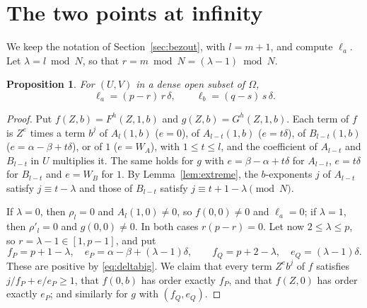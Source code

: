 \documentclass[11pt]{amsart}
\newtheorem{proposition}[theorem]{Proposition}
\theoremstyle{definition}
\theoremstyle{remark}
\numberwithin{equation}{section}
\begin{document}
\section{The two points at infinity}\label{sec:local}

We keep the notation of Section~\ref{sec:bezout}, with $l=m+1$, and compute $\ell_a$. Let $\lambda=l\bmod N$, so that $r=m\bmod N=(\lambda-1)\bmod N$.

\begin{proposition}\label{prop:local}
For $(U,V)$ in a dense open subset of $\Omega$,
\[
\ell_a=(p-r)\,r\,\delta,\qquad \ell_b=(q-s)\,s\,\delta .
\]
\end{proposition}

\begin{proof}
Put $f(Z,b)=F^h(Z,1,b)$ and $g(Z,b)=G^h(Z,1,b)$. Each term of $f$ is $Z^e$ times a term $b^j$ of $A_l(1,b)$ ($e=0$), of $A_{l-t}(1,b)$ ($e=t\delta$), of $B_{l-t}(1,b)$ ($e=\alpha-\beta+t\delta$), or of $1$ ($e=W_A$), with $1\le t\le l$, and the coefficient of $A_{l-t}$ and $B_{l-t}$ in $U$ multiplies it. The same holds for $g$ with $e=\beta-\alpha+t\delta$ for $A_{l-t}$, $e=t\delta$ for $B_{l-t}$ and $e=W_B$ for $1$. By Lemma~\ref{lem:extreme}, the $b$-exponents $j$ of $A_{l-t}$ satisfy $j\equiv t-\lambda$ and those of $B_{l-t}$ satisfy $j\equiv t+1-\lambda\pmod N$.

If $\lambda=0$, then $\rho_l=0$ and $A_l(1,0)\ne0$, so $f(0,0)\ne0$ and $\ell_a=0$; if $\lambda=1$, then $\rho'_l=0$ and $g(0,0)\ne0$. In both cases $r(p-r)=0$. Let now $2\le\lambda\le p$, so $r=\lambda-1\in[1,p-1]$, and put
\[
f_P=p+1-\lambda,\quad e_P=\alpha-\beta+(\lambda-1)\delta,\qquad f_Q=p+2-\lambda,\quad e_Q=(\lambda-1)\delta .
\]
These are positive by \eqref{eq:deltabig}. We claim that every term $Z^eb^j$ of $f$ satisfies $j/f_P+e/e_P\ge1$, that $f(0,b)$ has order exactly $f_P$, and that $f(Z,0)$ has order exactly $e_P$; and similarly for $g$ with $(f_Q,e_Q)$.


\end{proof}
\end{document}
